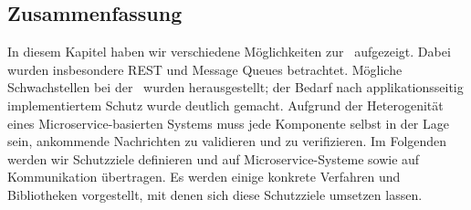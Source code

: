 \subsection{Zusammenfassung}

In diesem Kapitel haben wir verschiedene Möglichkeiten zur \stscom\ aufgezeigt. Dabei wurden insbesondere REST und Message Queues betrachtet. Mögliche Schwachstellen bei der \stscom\ wurden herausgestellt; der Bedarf nach applikationsseitig implementiertem Schutz wurde deutlich gemacht. Aufgrund der Heterogenität eines Microservice-basierten Systems muss jede Komponente selbst in der Lage sein, ankommende Nachrichten zu validieren und zu verifizieren. Im Folgenden werden wir Schutzziele definieren und auf Microservice-Systeme sowie auf Kommunikation übertragen. Es werden einige konkrete Verfahren und Bibliotheken vorgestellt, mit denen sich diese Schutzziele umsetzen lassen.